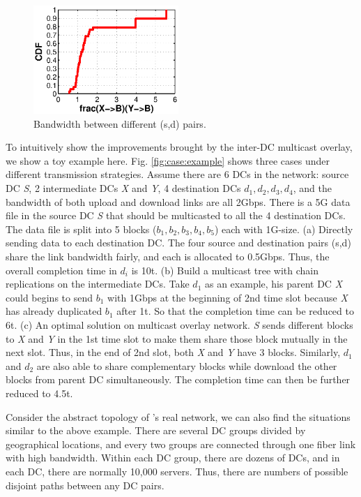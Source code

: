 \begin{figure}[t]
\centering
\includegraphics[width=55mm]{images/XBvsYB.eps}
\caption{Bandwidth between different (s,d) pairs.}
\label{fig:case:size}
\vspace{-0.4cm}
\end{figure}

To intuitively show the improvements brought by the inter-DC multicast overlay, we show a toy example here. Fig. \ref{fig:case:example} shows three cases under different transmission strategies. Assume there are 6 DCs in the network: source DC \emph{S}, 2 intermediate DCs \emph{X} and \emph{Y}, 4 destination DCs $d_1,d_2,d_3,d_4$, and the bandwidth of both upload and download links are all 2Gbps. There is a 5G data file in the source DC \emph{S} that should be multicasted to all the 4 destination DCs. The data file is split into 5 blocks ($b_1,b_2,b_3,b_4,b_5$) each with 1G-size. (a) Directly sending data to each destination DC. The four source and destination pairs (s,d) share the link bandwidth fairly, and each is allocated to 0.5Gbps. Thus, the overall completion time in $d_i$ is 10t. (b) Build a multicast tree with chain replications on the intermediate DCs. Take $d_1$ as an example, his parent DC \emph{X} could begins to send $b_1$ with 1Gbps at the beginning of 2nd time slot because \emph{X} has already duplicated $b_1$ after 1t. So that the completion time can be reduced to 6t. (c) An optimal solution on multicast overlay network. \emph{S} sends different blocks to \emph{X} and \emph{Y} in the 1st time slot to make them share those block mutually in the next slot. Thus, in the end of 2nd slot, both \emph{X} and \emph{Y} have 3 blocks. Similarly, $d_1$ and $d_2$ are also able to share complementary blocks while download the other blocks from parent DC simultaneously. The completion time can then be further reduced to 4.5t.

Consider the abstract topology of \company's real network, we can also find the situations similar to the above example. There are several DC groups divided by geographical locations, and every two groups are connected through one fiber link with high bandwidth. Within each DC group, there are dozens of DCs, and in each DC, there are normally 10,000 servers. Thus, there are numbers of possible disjoint paths between any DC pairs.

